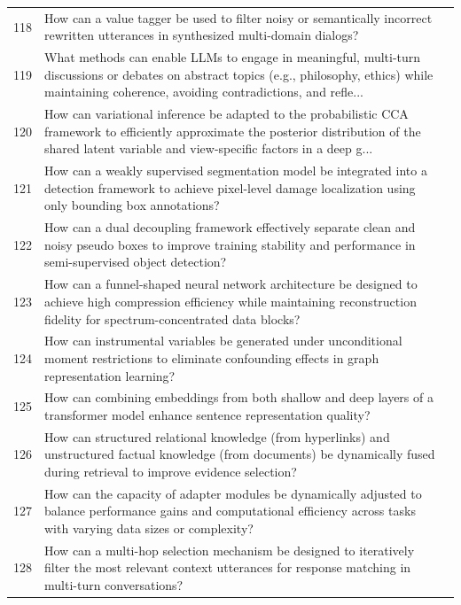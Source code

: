 \begin{longtable}{@{}p{0.5cm}p{7.2cm}p{2.5cm}@{}}
118 & How can a value tagger be used to filter noisy or semantically incorrect rewritten utterances in synthesized multi-domain dialogs? & \cite{10.18653/v1/2023.emnlp-main.946} \\
119 & What methods can enable LLMs to engage in meaningful, multi-turn discussions or debates on abstract topics (e.g., philosophy, ethics) while maintaining coherence, avoiding contradictions, and refle... & \cite{10.18653/v1/2023.emnlp-main.146} \\
120 & How can variational inference be adapted to the probabilistic CCA framework to efficiently approximate the posterior distribution of the shared latent variable and view-specific factors in a deep g... & \cite{10.1609/aaai.v35i9.16982} \\
121 & How can a weakly supervised segmentation model be integrated into a detection framework to achieve pixel-level damage localization using only bounding box annotations? & \cite{10.1609/aaai.v34i09.7110} \\
122 & How can a dual decoupling framework effectively separate clean and noisy pseudo boxes to improve training stability and performance in semi-supervised object detection? & \cite{10.1609/aaai.v36i3.20264} \\
123 & How can a funnel-shaped neural network architecture be designed to achieve high compression efficiency while maintaining reconstruction fidelity for spectrum-concentrated data blocks? & \cite{10.1609/aaai.v37i4.25602} \\
124 & How can instrumental variables be generated under unconditional moment restrictions to eliminate confounding effects in graph representation learning? & \cite{10.1609/aaai.v37i6.25925} \\
125 & How can combining embeddings from both shallow and deep layers of a transformer model enhance sentence representation quality? & \cite{10.18653/v1/2021.findings-emnlp.23} \\
126 & How can structured relational knowledge (from hyperlinks) and unstructured factual knowledge (from documents) be dynamically fused during retrieval to improve evidence selection? & \cite{10.1609/aaai.v35i15.17568} \\
127 & How can the capacity of adapter modules be dynamically adjusted to balance performance gains and computational efficiency across tasks with varying data sizes or complexity? & \cite{10.18653/v1/d19-1165} \\
128 & How can a multi-hop selection mechanism be designed to iteratively filter the most relevant context utterances for response matching in multi-turn conversations? & \cite{10.18653/v1/d19-1011} \\

\end{longtable}
